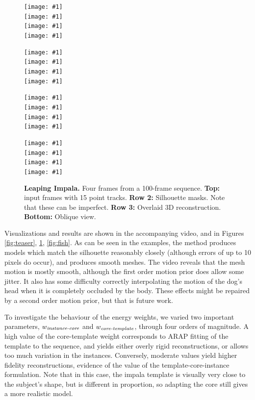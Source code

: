 \documentclass[preprint]{acmsiggraph}
\begin{document}
\begin{figure}
\setlength{\awfw}{0.25\linewidth}
\def\awfig#1{\texttt{[image: \#1]}}
\def\awfp#1#2#3{%
\parbox{\awfw}{%
\awfig{vid/impala0/Impala_1_Reduced_3B_AreaWeightedNormals_85-184_User_Constraints_Cropped/#2.png}\\
\awfig{vid/impala0/Impala_1_Reduced_3B_AreaWeightedNormals_85-184_Segmentations_Cropped/shutterstock_v1981186_1_1_00#3#2.png}\\
\awfig{vid/impala0/Impala_1_Reduced_3B_AreaWeightedNormals_85-184_10,1,1e-3,0.5,2,5e-2,0,0,0,8192,1024,0,0.5,8192_1.0,32.0,32.0,64.0,32.0_Cropped/#1/0.png}\\
\awfig{vid/impala0/Impala_1_Reduced_3B_AreaWeightedNormals_85-184_10,1,1e-3,0.5,2,5e-2,0,0,0,8192,1024,0,0.5,8192_1.0,32.0,32.0,64.0,32.0_Cropped/#1/2.png}}}
\awfp{40}{125}{}%
\awfp{50}{135}{}%
\awfp{60}{145}{}%
\awfp{70}{155}{}
\caption{\textbf{Leaping Impala.}  Four frames from a 100-frame sequence. \textbf{Top:} input frames with 15 point tracks.  \textbf{Row 2:} Silhouette masks.   Note that these can be imperfect.  \textbf{Row 3:} Overlaid 3D reconstruction. \textbf{Bottom:} Oblique view.}
\label{fig:impala}
\end{figure}

Visualizations and results are shown in the accompanying video, and in Figures \ref{fig:teaser}, \ref{fig:impala}, \ref{fig:fish}.  As can be seen in the examples, the method produces models which match the silhouette reasonably closely (although errors of up to 10 pixels do occur), and produces smooth meshes.   The video reveals that the mesh motion is mostly smooth, although the first order motion prior does allow some jitter.  It also has some difficulty correctly interpolating the motion of the dog's head when it is completely occluded by the body.   These effects might be repaired by a second order motion prior, but that is future work.

To investigate the behaviour of the energy weights, we varied two important parameters, $w_{\text{\em instance-core}}$ and $w_{\text{\em core-template}}$, through four orders of magnitude.  A high value of the core-template weight corresponds to ARAP fitting of the template to the sequence, and yields either overly rigid reconstructions, or allows too much variation in the instances.   Conversely, moderate values yield higher fidelity reconstructions, evidence of the value of the template-core-instance formulation.  Note that in this case, the impala template is visually very close to the subject's shape, but is different in proportion, so adapting the core still gives a more realistic model.
\end{document}
